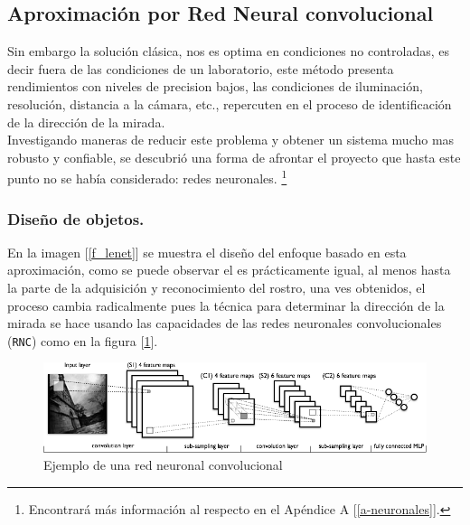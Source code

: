 \documentclass[12pt]{book} %
\begin{document}
	\subsection{Aproximación por Red Neural convolucional \label{lenet}}
		Sin embargo la solución clásica, nos es optima en condiciones no controladas, es decir fuera de las condiciones de un laboratorio, este método 
		presenta rendimientos con niveles de precision bajos, las condiciones de iluminación, resolución, distancia a la cámara, etc., repercuten en el 
		proceso de identificación de la dirección de la mirada.\\
		Investigando maneras de reducir este problema y obtener un sistema mucho mas robusto y confiable, se descubrió una forma de afrontar el proyecto que
		hasta este punto no se había considerado: \textsf{redes neuronales}.
		\footnote{\scriptsize Encontrará más información al respecto en el Apéndice A [\ref{a-neuronales}].}\\
		\subsubsection{Diseño de objetos.}		
			En la imagen [\ref{f_lenet}] se muestra el diseño del enfoque basado en esta aproximación, como se puede observar el es prácticamente igual,
			al menos hasta la parte de la adquisición y reconocimiento del rostro, una ves obtenidos, el proceso cambia radicalmente pues la técnica
			para determinar la dirección de la mirada se hace usando las capacidades de las redes neuronales convolucionales (\texttt{RNC}) como 	
			en la figura [\ref{f-cnn}].
			\begin{figure}
			\includegraphics[width=140mm]{mylenet.png}
			\caption{Ejemplo de una red neuronal convolucional \label{f-cnn}}
			\end{figure}
			
\end{document}
